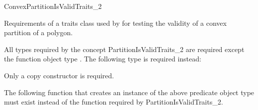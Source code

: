 
\renewcommand\ccRefPageBegin{\ccParDims\cgalColumnLayout\begin{ccAdvanced}}
\renewcommand\ccRefPageEnd{\ccParDims\cgalColumnLayout\end{ccAdvanced}}
\begin{ccRefConcept}{ConvexPartitionIsValidTraits_2}



\ccDefinition
  
Requirements of a traits class used 
by  for testing the validity of a
convex partition of a polygon.

\ccTypes

All types required by the concept PartitionIsValidTraits\_2 are required
except the function object type . The following type is
required instead:


\ccCreation

Only a copy constructor is required.


\ccOperations

The following function that creates an instance of the above predicate object
type must exist instead of the function  required by
PartitionIsValidTraits\_2.


\ccHasModels


\end{ccRefConcept}
